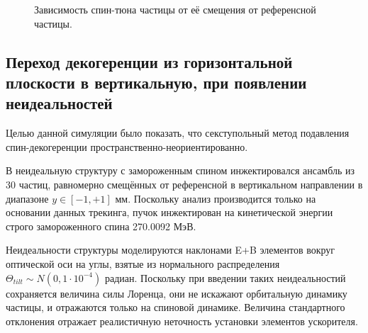 \begin{figure}[!h]\centering
	\caption{Зависимость спин-тюна частицы от её смещения от референсной частицы.\label{fig:decoh:perfect}}
\end{figure}

\subsection{Переход декогеренции из горизонтальной плоскости в вертикальную, при появлении неидеальностей}\label{sec:Decoherence-plane-transfer}
Целью данной симуляции было показать, что секступольный метод подавления спин-декогеренции 
пространственно-неориентированно.

В неидеальную структуру с замороженным спином инжектировался ансамбль из 30 частиц, равномерно смещённых 
от референсной в вертикальном направлении в диапазоне $y \in [-1, +1]$ мм. Поскольку анализ производится только
на основании данных трекинга, пучок инжектирован на кинетической энергии строго замороженного спина
270.0092 МэВ.

Неидеальности структуры моделируются наклонами E+B элементов вокруг оптической оси на углы, 
взятые из нормального распределения $\Theta_{tilt} \sim N(0, 1\cdot 10^{-4})$ радиан. 
Поскольку при введении таких неидеальностий сохраняется величина силы Лоренца, они не искажают 
орбитальную динамику частицы, и отражаются только на спиновой динамике. Величина стандартного отклонения
отражает реалистичную неточность установки элементов ускорителя. 


